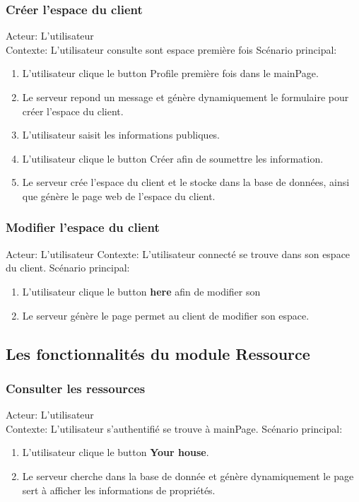 \documentclass[14px]{article}
\begin{document}
\subsubsection{Créer l'espace du client}
Acteur: L'utilisateur\\
Contexte: L'utilisateur consulte sont espace première fois
Scénario principal:
\begin{enumerate}
	\item L'utilisateur clique le button Profile première fois dans le mainPage.
	\item Le serveur repond un message et génère dynamiquement le formulaire pour créer l'espace du client.
	\item L'utilisateur saisit les informations publiques.
	\item L'utilisateur clique le button Créer afin de soumettre les information.
	\item Le serveur crée l'espace du client et le stocke dans la base de données, ainsi que génère le page web de l'espace du client.
\end{enumerate}

\subsubsection{Modifier l'espace du client}
Acteur: L'utilisateur
Contexte: L'utilisateur connecté se trouve dans son espace du client.
Scénario principal:
\begin{enumerate}
	\item L'utilisateur clique le button \textbf{here} afin de modifier son 
	\item Le serveur génère le page permet au client de modifier son espace.
\end{enumerate}

\subsection{Les fonctionnalités du module Ressource}
\subsubsection{Consulter les ressources}
Acteur: L'utilisateur\\
Contexte: L'utilisateur s'authentifié se trouve à mainPage.
Scénario principal:
\begin{enumerate}
	\item L'utilisateur clique le button \textbf{Your house}.
	\item Le serveur cherche dans la base de donnée et génère dynamiquement le page sert à afficher les informations de propriétés.
\end{enumerate}
\end{document}
